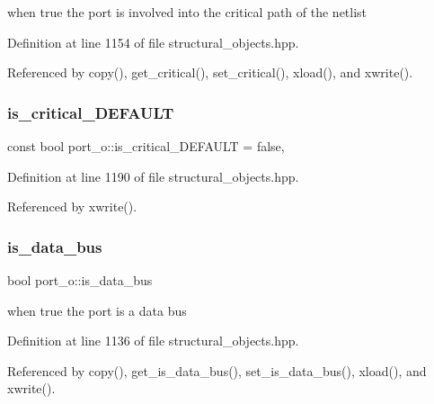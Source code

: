 when true the port is involved into the critical path of the netlist 



Definition at line 1154 of file structural\+\_\+objects.\+hpp.



Referenced by copy(), get\+\_\+critical(), set\+\_\+critical(), xload(), and xwrite().

\mbox{\label{structport__o_aa8e98dc5c57b5eec0c25f578c5ff2ea6}} 
\subsubsection{\texorpdfstring{is\+\_\+critical\+\_\+\+D\+E\+F\+A\+U\+LT}{is\_critical\_DEFAULT}}
{\footnotesize\ttfamily const bool port\+\_\+o\+::is\+\_\+critical\+\_\+\+D\+E\+F\+A\+U\+LT = false\hspace{0.3cm}{\ttfamily [static]}, {\ttfamily [private]}}



Definition at line 1190 of file structural\+\_\+objects.\+hpp.



Referenced by xwrite().

\mbox{\label{structport__o_adfab03b8f047b4deecbc8bf70b4ea2da}} 
\subsubsection{\texorpdfstring{is\+\_\+data\+\_\+bus}{is\_data\_bus}}
{\footnotesize\ttfamily bool port\+\_\+o\+::is\+\_\+data\+\_\+bus\hspace{0.3cm}{\ttfamily [private]}}



when true the port is a data bus 



Definition at line 1136 of file structural\+\_\+objects.\+hpp.



Referenced by copy(), get\+\_\+is\+\_\+data\+\_\+bus(), set\+\_\+is\+\_\+data\+\_\+bus(), xload(), and xwrite().

